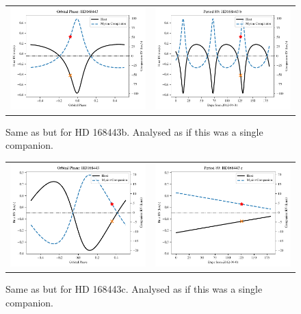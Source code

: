 \begin{figure}
    \centering
    \begin{tabular}{cc}
        \includegraphics[width=0.45\linewidth]{figures/direct-recovery/orbital-plots/HD168443b_orbital_phase.pdf}&
        \includegraphics[width=0.45\linewidth]{figures/direct-recovery/orbital-plots/HD168443b_p89.pdf}\\
    \end{tabular}
    \caption{Same as  but for HD 168443b.  Analysed as if this was a single companion.}
    \label{fig:hd168443bp89}
\end{figure}


\begin{figure}
    \centering
    \begin{tabular}{cc}
        \includegraphics[width=0.45\linewidth]{figures/direct-recovery/orbital-plots/HD168443c_orbital_phase.pdf}&
        \includegraphics[width=0.45\linewidth]{figures/direct-recovery/orbital-plots/HD168443c_p89.pdf}\\
    \end{tabular}
    \caption{Same as  but for HD 168443c.  Analysed as if this was a single companion.}
    \label{fig:hd168443cp89}
\end{figure}

